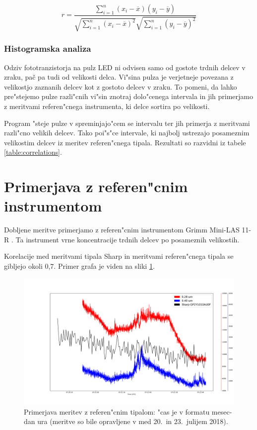 \documentclass[12pt,a4paper]{article}
\begin{document}
$$
r = \frac{\sum_{i=1}^{n} (x_i - \overline{x}) (y_i - \overline{y})}{\sqrt{\sum_{i=1}^{n} (x_i - \overline{x})^2} \sqrt{\sum_{i=1}^{n} (y_i - \overline{y})^2}}
$$


\subsubsection{Histogramska analiza}
Odziv fototranzistorja na pulz LED ni odvisen samo od gostote trdnih delcev v zraku, pač pa tudi od velikosti delca. Vi"sina pulza je verjetneje povezana z velikostjo zaznanih delcev kot z gostoto delcev v zraku. To pomeni, da lahko pre"stejemo pulze razli"cnih vi"sin znotraj dolo"cenega intervala in jih primerjamo z meritvami referen"cnega instrumenta, ki delce sortira po velikosti.

Program "steje pulze v spreminjajo"cem se intervalu ter jih primerja z meritvami razli"cno velikih delcev. Tako poi"s"ce intervale, ki najbolj ustrezajo posameznim velikostim delcev iz meritev referen"cnega tipala. Rezultati so razvidni iz tabele \ref{table:correlations}.

\clearpage
\section{Primerjava z referen"cnim instrumentom}
Dobljene meritve primerjamo z referen"cnim instrumentom Grimm Mini-LAS 11-R \cite{grimm-min-las}. Ta instrument vrne koncentracije trdnih delcev po posameznih velikostih.

Korelacije med meritvami tipala Sharp in meritvami referen"cnega tipala se gibljejo okoli 0,7. Primer grafa je viden na sliki \ref{comparison}.

\begin{figure}[H]
	\begin{center}
		\includegraphics[width=16cm]{comparison.pdf}
		\caption{Primerjava meritev z referen"cnim tipalom: "cas je v formatu mesec-dan ura (meritve so bile opravljene v med 20.~in 23.~julijem 2018). }
		\label{comparison}
	\end{center}
\end{figure}
\end{document}
